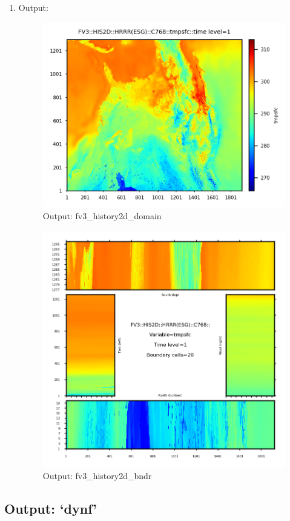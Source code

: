 \documentclass[11pt,fleqn]{report}              %
\begin{document}
\begin{enumerate}
\item Output:
\begin{figure}[ht!]
  \centering
  \includegraphics[width=0.6\linewidth]{fv3_out_his2d_HRRR_esg_C768_tmpsfc_domain.png}  
  \caption{Output: fv3\_history2d\_domain}
  \label{fig:py_out_his2d_domain}
\end{figure}

\begin{figure}[ht!]
  \centering
  \includegraphics[width=0.6\linewidth]{fv3_out_his2d_HRRR_esg_C768_tmpsfc_bndr.png}
  \caption{Output: fv3\_history2d\_bndr}
  \label{fig:py_out_his2d_bndr}
\end{figure}

\end{enumerate}




\subsection{Output: `dynf'}
\label{subsec:python_dynf}
\end{document}
